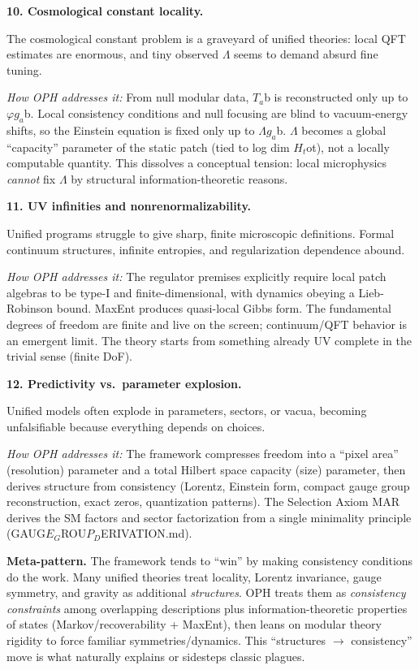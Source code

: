 \documentclass[11pt,a4paper]{article}
\theoremstyle{remark}
\begin{document}
\textbf{10. Cosmological constant locality.}

The cosmological constant problem is a graveyard of unified theories: local QFT estimates are enormous, and tiny observed \ensuremath{\Lambda} seems to demand absurd fine tuning.

\emph{How OPH addresses it:} From null modular data, \(T_a\)b is reconstructed only up to \(\ensuremath{\varphi}g_a\)b. Local consistency conditions and null focusing are blind to vacuum-energy shifts, so the Einstein equation is fixed only up to \(\ensuremath{\Lambda}g_a\)b. \ensuremath{\Lambda} becomes a global ``capacity'' parameter of the static patch (tied to log dim \(H_t\)ot), not a locally computable quantity. This dissolves a conceptual tension: local microphysics \emph{cannot} fix \ensuremath{\Lambda} by structural information-theoretic reasons.

\textbf{11. UV infinities and nonrenormalizability.}

Unified programs struggle to give sharp, finite microscopic definitions. Formal continuum structures, infinite entropies, and regularization dependence abound.

\emph{How OPH addresses it:} The regulator premises explicitly require local patch algebras to be type-I and finite-dimensional, with dynamics obeying a Lieb-Robinson bound. MaxEnt produces quasi-local Gibbs form. The fundamental degrees of freedom are finite and live on the screen; continuum/QFT behavior is an emergent limit. The theory starts from something already UV complete in the trivial sense (finite DoF).

\textbf{12. Predictivity vs.~parameter explosion.}

Unified models often explode in parameters, sectors, or vacua, becoming unfalsifiable because everything depends on choices.

\emph{How OPH addresses it:} The framework compresses freedom into a ``pixel area'' (resolution) parameter and a total Hilbert space capacity (size) parameter, then derives structure from consistency (Lorentz, Einstein form, compact gauge group reconstruction, exact zeros, quantization patterns). The Selection Axiom MAR derives the SM factors and sector factorization from a single minimality principle (GAUG$E_G$ROU$P_D$ERIVATION.md).

\textbf{Meta-pattern.} The framework tends to ``win'' by making consistency conditions do the work. Many unified theories treat locality, Lorentz invariance, gauge symmetry, and gravity as additional \emph{structures}. OPH treats them as \emph{consistency constraints} among overlapping descriptions plus information-theoretic properties of states (Markov/recoverability + MaxEnt), then leans on modular theory rigidity to force familiar symmetries/dynamics. This ``structures \ensuremath{\to} consistency'' move is what naturally explains or sidesteps classic plagues.
\end{document}
